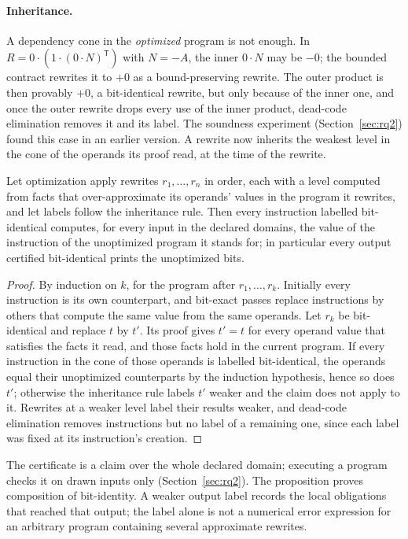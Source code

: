 \documentclass[acmsmall,review,anonymous,nonacm]{acmart}
\begin{document}
\paragraph{Inheritance.} A dependency cone in the \emph{optimized} program is
not enough. In $R = 0\cdot(1\cdot(0\cdot N)^{\mathsf T})$ with $N=-A$, the inner
$0\cdot N$ may be $-0$; the bounded contract rewrites it to $+0$ as a
bound-preserving rewrite. The outer product is then provably $+0$, a
bit-identical rewrite, but only because of the inner one, and once the outer
rewrite drops every use of the inner product, dead-code elimination removes it
and its label. The soundness experiment (Section~\ref{sec:rq2}) found this case
in an earlier version. A rewrite now inherits the weakest level in the cone of
the operands its proof read, at the time of the rewrite.

\begin{proposition}\label{prop:cert}
Let optimization apply rewrites $r_1,\dots,r_n$ in order, each with a level
computed from facts that over-approximate its operands' values in the program
it rewrites, and let labels follow the inheritance rule. Then every instruction
labelled bit-identical computes, for every input in the declared domains, the
value of the instruction of the unoptimized program it stands for; in
particular every output certified bit-identical prints the unoptimized bits.
\end{proposition}
\begin{proof}
By induction on $k$, for the program after $r_1,\dots,r_k$. Initially every
instruction is its own counterpart, and bit-exact passes replace instructions
by others that compute the same value from the same operands. Let $r_k$ be
bit-identical and replace $t$ by $t'$. Its proof gives $t'=t$ for every operand
value that satisfies the facts it read, and those facts hold in the current
program. If every instruction in the cone of those operands is labelled
bit-identical, the operands equal their unoptimized counterparts by the
induction hypothesis, hence so does $t'$; otherwise the inheritance rule labels
$t'$ weaker and the claim does not apply to it. Rewrites at a weaker level label
their results weaker, and dead-code elimination removes instructions but no
label of a remaining one, since each label was fixed at its instruction's creation.
\end{proof}
The certificate is a claim over the whole declared domain; executing a program
checks it on drawn inputs only (Section~\ref{sec:rq2}). The proposition proves
composition of bit-identity. A weaker output label records the local obligations
that reached that output; the label alone is not a numerical error expression
for an arbitrary program containing several approximate rewrites.
\end{document}
